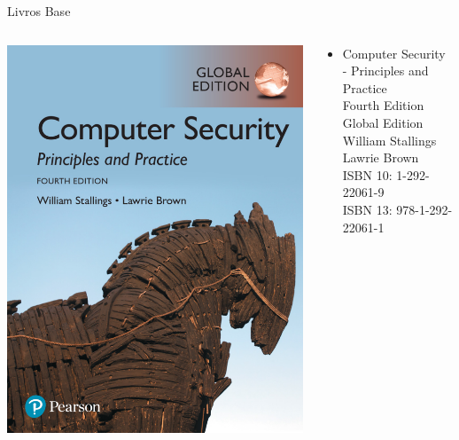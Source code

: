 \begin{frame}{Livros Base}
  \centering
  \begin{columns}
    \begin{column}{0.5\linewidth}
      \includegraphics[width=0.8\linewidth]{Figuras/livro-stallings-sec.png}
    \end{column}
    \begin{column}{0.5\linewidth}
      \begin{itemize}
        \item Computer Security - Principles and Practice\\
              Fourth Edition \\
              Global Edition \\
              William Stallings \\
              Lawrie Brown \\
              ISBN 10: 1-292-22061-9\\
              ISBN 13: 978-1-292-22061-1
      \end{itemize}
    \end{column}
  \end{columns}

\end{frame}

